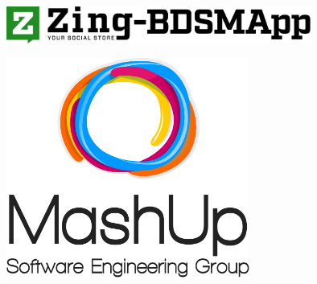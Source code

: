 %


\thispagestyle{empty}
\setlength{\topmargin}{-60pt}
\begin{figure}[!t]
	\centering
	\includegraphics[width=10cm]{../template/images/logo/zing.pdf}
\end{figure}
\vspace{1pt}
\begin{figure}[!t]
	\centering
	\includegraphics[width=8cm]{../template/images/logo/logo_verticale.pdf}
\end{figure}

\begin{center}
 	\groupEmail
\end{center}

